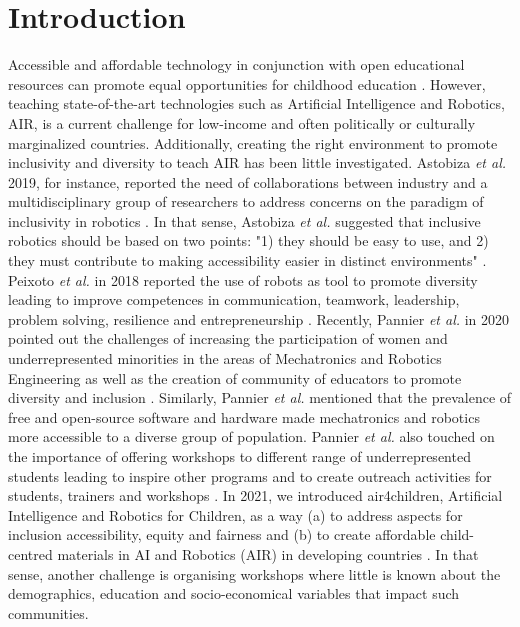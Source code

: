 \documentclass[conference]{IEEEtran}
\newcommand{\etal}{\textit{et al. }} %
\begin{document}
\section{Introduction}
Accessible and affordable technology in conjunction with open educational resources can promote equal opportunities for childhood education \cite{yoshie2021-unesco}.
However, teaching state-of-the-art technologies such as Artificial Intelligence and Robotics, AIR, is a current challenge for low-income and often politically or culturally marginalized countries.
Additionally, creating the right environment to promote inclusivity and diversity to teach AIR has been little investigated. 
Astobiza \etal 2019, for instance, reported the need of collaborations between industry and a multidisciplinary group of researchers to address concerns on the paradigm of inclusivity in robotics \cite{MonasterioAstobiza2019}.
In that sense, Astobiza \etal suggested that inclusive robotics should be based on two points: "1) they should be easy to use, and 2) they must contribute to making accessibility easier in distinct environments" \cite{MonasterioAstobiza2019}.
Peixoto \etal in 2018 reported the use of robots as tool to promote diversity leading to improve competences in communication, teamwork, leadership, problem solving, resilience and entrepreneurship \cite{PeixotoCastro2018, PeixotoGonzalez2018}. 
Recently, Pannier \etal in 2020 pointed out the challenges of increasing the  participation of women and underrepresented minorities in the areas of Mechatronics and Robotics Engineering as well as the creation of community of educators to promote diversity and inclusion \cite{Pannier2020}.
Similarly, Pannier \etal mentioned that the prevalence of free and open-source software and hardware made mechatronics and robotics more accessible to a diverse group of population.
Pannier \etal also touched on the importance of offering workshops to different range of underrepresented students leading to inspire other programs and to create outreach activities for students, trainers and workshops \cite{Pannier2020}.
In 2021, we introduced air4children, Artificial Intelligence and Robotics for Children, as a way (a) to address aspects for inclusion accessibility, equity and fairness and (b) to create affordable child-centred materials in AI and Robotics (AIR) in developing countries \cite{montenegro2021air4children}. 
In that sense, another challenge is organising workshops where little is known about the demographics, education and socio-economical variables that impact such communities.
\end{document}
